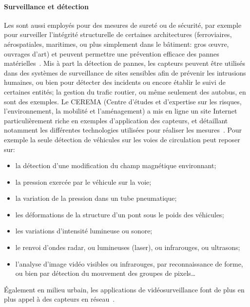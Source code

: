         \paragraph{Surveillance et détection}
Les \rcsfs sont aussi employés pour des mesures de sureté ou de sécurité, par exemple pour surveiller l'intégrité structurelle de certaines architectures (ferroviaires, aérospatiales, maritimes, ou plus simplement dans le bâtiment: gros œuvre, ouvrages d'art) et peuvent permettre une prévention efficace des pannes matérielles~\cite{SCOA13}.
Mis à part la détection de pannes, les capteurs peuvent être utilisés dans des systèmes de surveillance de sites sensibles afin de prévenir les intrusions humaines, ou bien pour détecter des incidents ou encore établir le suivi de certaines entités; la gestion du trafic routier, ou même seulement des autobus, en sont des exemples.
Le CEREMA (Centre d'études et d'expertise sur les risques, l'environnement, la mobilité et l'aménagement) a mis en ligne un site Internet particulièrement riche en exemples d'application des capteurs, et détaillant notamment les différentes technologies utilisées pour réaliser les mesures~\cite{sti}.
Pour exemple la seule détection de véhicules sur les voies de circulation peut reposer sur:
\begin{itemize}
    \item la détection d'une modification du champ magnétique environnant;
    \item la pression exercée par le véhicule sur la voie;
    \item la variation de la pression dans un tube pneumatique;
    \item les déformations de la structure d'un pont sous le poids des véhicules;
    \item les variations d'intensité lumineuse ou sonore;
    \item le renvoi d'ondes radar, ou lumineuses (laser), ou infrarouges, ou ultrasons;
    \item l'analyse d'image vidéo visibles ou infrarouges, par reconnaissance de forme, ou bien par détection du mouvement des groupes de pixels…
\end{itemize}

Également en milieu urbain, les applications de vidéosurveillance font de plus en plus appel à des capteurs en réseau~\cite{SZFDXC14}.

